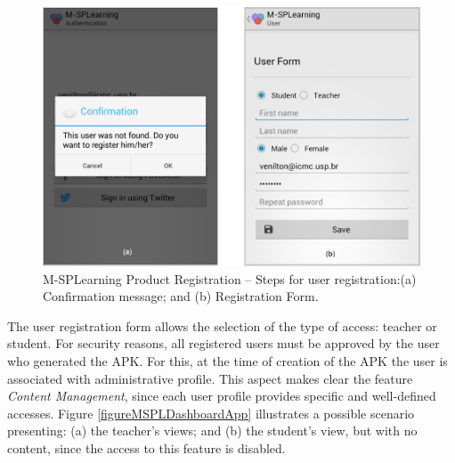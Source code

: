 \begin{figure}[!ht]
\centering
\includegraphics[scale=0.335]{figures/section3/MSPLRegister}
\caption{M-SPLearning Product Registration -- Steps for user registration:\newline(a) Confirmation message; and (b) Registration Form.}
\label{figureMSPLRegister}
\end{figure}

The user registration form allows the selection of the type of access: teacher or student. For security reasons, all registered users must be approved by the user who generated the APK. For this, at the time of creation of the APK the user is associated with administrative profile. This aspect makes clear the feature \textit{Content Management}, since each user profile provides specific and well-defined accesses. Figure \ref{figureMSPLDashboardApp} illustrates a possible scenario presenting: (a) the teacher's views; and (b) the student's view, but with no content, since the access to this feature is disabled.


